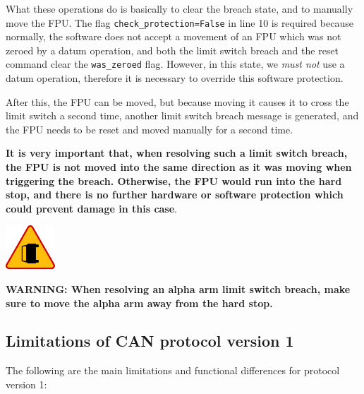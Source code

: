 \documentclass[11pt,a4paper]{report}
\newenvironment{warning}{\begin{framed}\includegraphics[width=5em]{accident-area-ahead.png}
}{\end{framed}}
\begin{document}
What these operations do is basically to clear the breach state, and
to manually move the FPU.  The flag \texttt{check\_protection=False}
in line 10 is required because normally, the software does not accept
a movement of an FPU which was not zeroed by a datum operation, and
both the limit switch breach and the reset command clear the
\texttt{was\_zeroed} flag. However, in this state, we \emph{must not}
use a datum operation, therefore it is necessary to override this
software protection.

After this, the FPU can be moved, but because moving it causes it to
cross the limit switch a second time, another limit switch breach
message is generated, and the FPU needs to be reset and moved manually
for a second time.

\textbf{It is very important that, when resolving such a limit switch
  breach, the FPU is not moved into the same direction as it was
  moving when triggering the breach.  Otherwise, the FPU would run
  into the hard stop, and there is no further hardware or software
  protection which could prevent damage in this case}.

\begin{warning}
  \textbf{WARNING: When resolving an alpha arm limit switch
    breach, make sure to move the alpha arm away from the hard stop.}
\end{warning}

\subsection{Limitations of CAN protocol version 1}
The following are the main limitations and functional
differences for protocol version 1:
\end{document}
